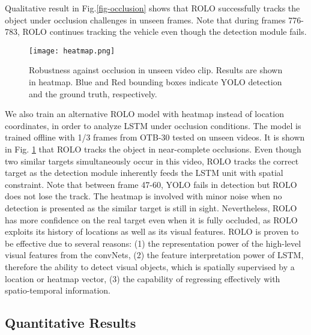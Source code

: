 \documentclass{article}
\begin{document}
Qualitative result in Fig.\ref{fig-occlusion} shows that ROLO successfully tracks the object under occlusion challenges in unseen frames. Note that during frames 776-783, ROLO continues tracking the vehicle even though the detection module fails.
\begin{figure}[h] %
	\centering
	\captionsetup{justification=centering}
	\texttt{[image: heatmap.png]}
	\caption{Robustness against occlusion in unseen video clip. Results are shown in heatmap. Blue and Red bounding boxes indicate YOLO detection and the ground truth, respectively.}
	\label{fig-occlusion-heatmap}
\end{figure}
We also train an alternative ROLO model with heatmap instead of location coordinates, in order to analyze LSTM under occlusion conditions. The model is trained offline with 1/3 frames from OTB-30 tested on unseen videos.
It is shown in Fig. \ref{fig-occlusion-heatmap} that ROLO tracks the object in near-complete occlusions.
Even though two similar targets simultaneously occur in this video, ROLO tracks the correct target as the detection module inherently feeds the LSTM unit with spatial constraint.
Note that between frame 47-60, YOLO fails in detection but ROLO does not lose the track.
The heatmap is involved with minor noise when no detection is presented as the similar target is still in sight. Nevertheless, ROLO has more confidence on the real target even when it is fully occluded,
as ROLO exploits its history of locations as well as its visual features.
ROLO is proven to be effective due to several reasons: (1) the representation power of the high-level visual features from the convNets, (2) the feature interpretation power of LSTM, therefore the ability to detect visual objects, which is spatially supervised by a location or heatmap vector, (3) the capability of regressing effectively with spatio-temporal information.


\subsection{Quantitative Results}
\end{document}

